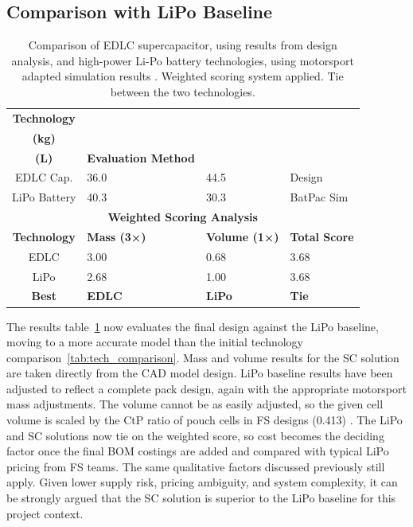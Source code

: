 \documentclass[11pt, a4paper]{report}
\numberwithin{equation}{section}
\begin{document}
\subsection{Comparison with LiPo Baseline}

\begin{table}[htbp]
    \centering
    \caption{Comparison of EDLC supercapacitor, using results from design analysis, and high-power Li-Po battery technologies, using motorsport adapted simulation results \cite{batpac2022manual}. Weighted scoring system applied. Tie between the two technologies.}
    \label{tab:results_comparison}
    \footnotesize
    \begin{tabular}{|c|l|l|l|}
        \hline
        \textbf{Technology} & \makecell{\textbf{Mass} \\ \textbf{(kg)}} & \makecell{\textbf{Volume} \\ \textbf{(L)}} & \textbf{Evaluation Method} \\
        \hline
        EDLC Cap. & 36.0 & 44.5 & Design \\
        \arrayrulecolor{gray!30}\hline\arrayrulecolor{black}
        LiPo Battery & 40.3 & 30.3 & BatPac Sim \\
        \hline
        \hline
        \multicolumn{4}{|c|}{\textbf{Weighted Scoring Analysis}} \\
        \hline
        \textbf{Technology} & \textbf{Mass (3×)} & \textbf{Volume (1×)} & \textbf{Total Score} \\
        \hline
        EDLC & 3.00 & 0.68 & 3.68 \\
        \arrayrulecolor{gray!30}\hline\arrayrulecolor{black}
        LiPo & 2.68 & 1.00 & 3.68 \\
        \hline
        \textbf{Best} & \textbf{EDLC} & \textbf{LiPo} & \cellcolor{orange!20}\textbf{Tie} \\
        \hline
    \end{tabular}
\end{table}

The results table~\ref{tab:results_comparison} now evaluates the final design against the LiPo baseline, moving to a more accurate model than the initial technology comparison~\ref{tab:tech_comparison}. Mass and volume results for the SC solution are taken directly from the CAD model design. LiPo baseline results have been adjusted to reflect a complete pack design, again with the appropriate motorsport mass adjustments. The volume cannot be as easily adjusted, so the given cell volume is scaled by the CtP ratio of pouch cells in FS designs (0.413) \cite{epp_multiphysical_battery}. The LiPo and SC solutions now tie on the weighted score, so cost becomes the deciding factor once the final BOM costings are added and compared with typical LiPo pricing from FS teams.
The same qualitative factors discussed previously still apply. Given lower supply risk, pricing ambiguity, and system complexity, it can be strongly argued that the SC solution is superior to the LiPo baseline for this project context.
\end{document}
